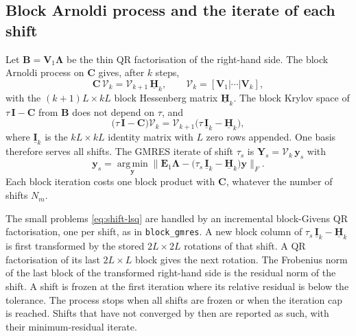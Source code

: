 \documentclass[11pt,a4paper]{article}
\begin{document}
\subsection{Block Arnoldi process and the iterate of each shift}
\label{sec:shift-arnoldi}

Let $\mathbf{B} = \mathbf{V}_1\boldsymbol{\Lambda}$ be the thin QR
factorisation of the right-hand side.
The block Arnoldi process on $\mathbf{C}$ gives, after $k$ steps,
\begin{equation}
  \mathbf{C}\,\mathcal{V}_k = \mathcal{V}_{k+1}\,\underline{\mathbf{H}}_k,
  \qquad
  \mathcal{V}_k = [\mathbf{V}_1|\cdots|\mathbf{V}_k],
  \label{eq:shift-arnoldi}
\end{equation}
with the $(k+1)L \times kL$ block Hessenberg matrix
$\underline{\mathbf{H}}_k$.
The block Krylov space of $\tau\,\mathbf{I} - \mathbf{C}$ from
$\mathbf{B}$ does not depend on $\tau$, and
\begin{equation}
  \bigl(\tau\,\mathbf{I} - \mathbf{C}\bigr)\mathcal{V}_k
    = \mathcal{V}_{k+1}
      \bigl(\tau\,\underline{\mathbf{I}}_k - \underline{\mathbf{H}}_k\bigr),
  \label{eq:shift-invariance}
\end{equation}
where $\underline{\mathbf{I}}_k$ is the $kL \times kL$ identity matrix
with $L$ zero rows appended.
One basis therefore serves all shifts.
The GMRES iterate of shift $\tau_s$ is
$\mathbf{Y}_s = \mathcal{V}_k\,\mathbf{y}_s$ with
\begin{equation}
  \mathbf{y}_s
    = \operatorname*{arg\,min}_{\mathbf{y}}
      \bigl\|\mathbf{E}_1\boldsymbol{\Lambda}
        - \bigl(\tau_s\,\underline{\mathbf{I}}_k
                - \underline{\mathbf{H}}_k\bigr)\mathbf{y}\bigr\|_F .
  \label{eq:shift-lsq}
\end{equation}
Each block iteration costs one block product with $\mathbf{C}$,
whatever the number of shifts $N_m$.

The small problems \eqref{eq:shift-lsq} are handled by an incremental
block-Givens QR factorisation, one per shift, as in
\texttt{block\_gmres}.
A new block column of $\tau_s\,\underline{\mathbf{I}}_k
- \underline{\mathbf{H}}_k$ is first transformed by the stored
$2L \times 2L$ rotations of that shift.
A QR factorisation of its last $2L \times L$ block gives the next
rotation.
The Frobenius norm of the last block of the transformed right-hand
side is the residual norm of the shift.
A shift is frozen at the first iteration where its relative residual
is below the tolerance.
The process stops when all shifts are frozen or when the iteration cap
is reached.
Shifts that have not converged by then are reported as such, with
their minimum-residual iterate.
\end{document}
